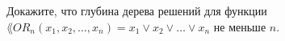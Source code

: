 Докажите, что глубина дерева решений для функции $\lang{OR}_n(x_1, x_2, \dots, x_n) = x_1 \lor x_2 \lor \dots \lor x_n$ не
меньше $n$.